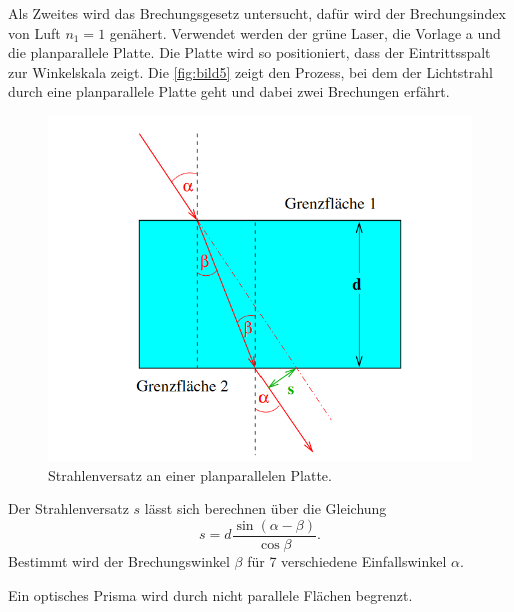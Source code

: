 Als Zweites wird das Brechungsgesetz untersucht, dafür wird der Brechungsindex von Luft $n_1 = 1$ genähert.
Verwendet werden der grüne Laser, die Vorlage a und die planparallele Platte. Die Platte wird so positioniert, dass 
der Eintrittsspalt zur Winkelskala zeigt. Die \autoref{fig:bild5} zeigt den Prozess, bei dem der Lichtstrahl durch eine planparallele
Platte geht und dabei zwei Brechungen erfährt.
\begin{figure}[H]
    \centering
	\includegraphics[width=0.6\linewidth]{content/grafik/strahlen.png}
	\caption{Strahlenversatz an einer planparallelen Platte. \cite{reflex}}
	\label{fig:bild5}
\end{figure}
Der Strahlenversatz $s$ lässt sich berechnen über die Gleichung 
\begin{equation}
	s=d \frac{\sin (\alpha-\beta)}{\cos \beta}.
	\end{equation}
Bestimmt wird der Brechungswinkel $\beta$ für 7 verschiedene Einfallswinkel $\alpha$.

Ein optisches Prisma wird durch nicht parallele Flächen begrenzt.
